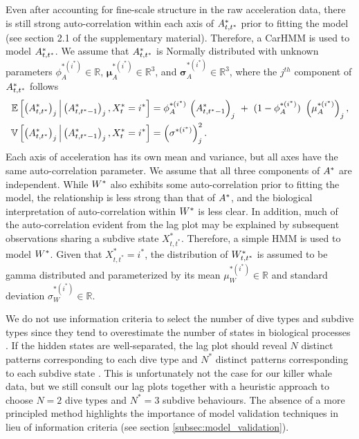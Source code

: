 Even after accounting for fine-scale structure in the raw acceleration data, there is still strong auto-correlation within each axis of $A^*_{t,t^*}$ prior to fitting the model (see section 2.1 of the supplementary material). Therefore, a CarHMM is used to model $A^*_{t,t^*}$. We assume that $A^*_{t,t^*}$ is Normally distributed with unknown parameters $\phi_A^{*(i^*)} \in \mathbb{R}$, $\mathbf{\mu}_A^{*(i^*)} \in \mathbb{R}^3$, and $\mathbf{\sigma}_A^{*(i^*)} \in \mathbb{R}^3$, where the $j^{th}$ component of $A^*_{t,t^*}$ follows
%
\begin{align*}
    \mathbb{E}\left[\left(A^*_{t,t^*}\right)_j\Big|\left(A^*_{t,t^*-1}\right)_j ,X^*_t=i^*\right] &= \phi_A^{*(i^*)} ~ \Big(A^*_{t,t^*-1}\Big)_j ~+ ~(1-\phi_A^{*(i^*)}) ~\left(\mu_A^{*(i^*)}\right)_j,\\
    \mathbb{V}\left[\left(A^*_{t,t^*}\right)_j\Big|\left(A^*_{t,t^*-1}\right)_j ,X^*_t=i^*\right] &= \left(\sigma^{*(i^*)}\right)^2_j.
\end{align*}
%
Each axis of acceleration has its own mean and variance, but all axes have the same auto-correlation parameter. We assume that all three components of $A^*$ are independent.
%
%
While $W^*$ also exhibits some auto-correlation prior to fitting the model, the relationship is less strong than that of $A^*$, and the biological interpretation of auto-correlation within $W^*$ is less clear. In addition, much of the auto-correlation evident from the lag plot may be explained by subsequent observations sharing a subdive state $X^*_{t,t^*}$. Therefore, a simple HMM is used to model $W^*$. Given that $X^*_{t,t^*} = i^*$, the distribution of $W^*_{t,t^*}$ is assumed to be gamma distributed and parameterized by its mean $\mu_W^{*(i^*)} \in \mathbb{R}$ and standard deviation $\sigma_W^{*(i^*)} \in \mathbb{R}$.
%
%

We do not use information criteria to select the number of dive types and subdive types since they tend to overestimate the number of states in biological processes \citep{Pohle:2017}. If the hidden states are well-separated, the lag plot should reveal $N$ distinct patterns corresponding to each dive type and $N^*$ distinct patterns corresponding to each subdive state \citep{Lawler:2019}. This is unfortunately not the case for our killer whale data, but we still consult our lag plots together with a heuristic approach to choose $N = 2$ dive types and $N^* = 3$ subdive behaviours. The absence of a more principled method highlights the importance of model validation techniques in lieu of information criteria (see section \ref{subsec:model_validation}). 

